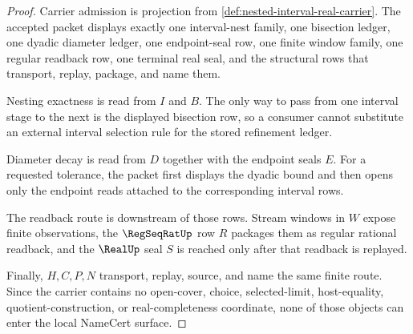 \begin{proof}
Carrier admission is projection from \autoref{def:nested-interval-real-carrier}. The accepted packet displays exactly one interval-nest family, one bisection ledger, one dyadic diameter ledger, one endpoint-seal row, one finite window family, one regular readback row, one terminal real seal, and the structural rows that transport, replay, package, and name them.

Nesting exactness is read from $I$ and $B$. The only way to pass from one interval stage to the next is the displayed bisection row, so a consumer cannot substitute an external interval selection rule for the stored refinement ledger.

Diameter decay is read from $D$ together with the endpoint seals $E$. For a requested tolerance, the packet first displays the dyadic bound and then opens only the endpoint reads attached to the corresponding interval rows.

The readback route is downstream of those rows. Stream windows in $W$ expose finite observations, the $\RegSeqRatUp$ row $R$ packages them as regular rational readback, and the $\RealUp$ seal $S$ is reached only after that readback is replayed.

Finally, $H,C,P,N$ transport, replay, source, and name the same finite route. Since the carrier contains no open-cover, choice, selected-limit, host-equality, quotient-construction, or real-completeness coordinate, none of those objects can enter the local NameCert surface.
\end{proof}

